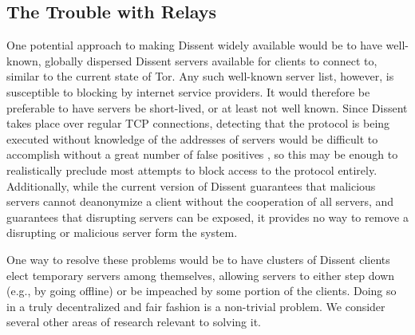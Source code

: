   \subsection{The Trouble with Relays}
  \label{Subsection:Relays}
    One potential approach to making Dissent widely available would be to have
    well-known, globally dispersed Dissent servers available for clients to
    connect to, similar to the current state of Tor. Any such well-known server
    list, however, is susceptible to blocking by internet service providers. It
    would therefore be preferable to have servers be short-lived, or at least
    not well known. Since Dissent takes place over regular TCP connections,
    detecting that the protocol is being executed without knowledge of the
    addresses of servers would be difficult to accomplish without a great number
    of false positives \cite{houmansadr_parrot_2013}, so this may be enough to
    realistically preclude most attempts to block access to the protocol
    entirely.  Additionally, while the current version of Dissent guarantees
    that malicious servers cannot deanonymize a client without the cooperation
    of all servers, and guarantees that disrupting servers can be exposed, it
    provides no way to remove a disrupting or malicious server form the system.

    One way to resolve these problems would be to have clusters of Dissent
    clients elect temporary servers among themselves, allowing servers to either
    step down (e.g., by going offline) or be impeached by some portion of the
    clients.  Doing so in a truly decentralized and fair fashion is a
    non-trivial problem.  We consider several other areas of research relevant
    to solving it.


